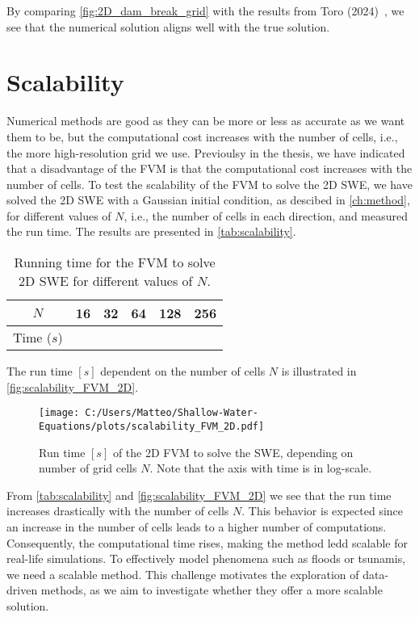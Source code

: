 By comparing \autoref{fig:2D_dam_break_grid} with the results from Toro (2024)~\cite{Toro2024}, we see that the numerical solution aligns well with the true solution.


\section{Scalability}\label{sec:scalability}
Numerical methods are good as they can be more or less as accurate as we want them to be, but the computational cost increases with the number of cells, i.e., the more high-resolution grid we use.
Previoulsy in the thesis, we have indicated that a disadvantage of the FVM is that the computational cost increases with the number of cells.
To test the scalability of the FVM to solve the 2D SWE, we have solved the 2D SWE with a Gaussian initial condition, as descibed in \autoref{ch:method}, for different values of $N$, i.e., the number of cells in each direction, and measured the run time.
The results are presented in \autoref{tab:scalability}.
\begin{table}[H]
    \centering
    \begin{tabular}{c|ccccc}
        \hline
        $N$ & 16 & 32 & 64 & 128 & 256 \\
        \hline 
        Time ($s$) & 
         &
         &
         &
         &
        
        \\
        \hline
    \end{tabular}
    \caption{Running time for the FVM to solve 2D SWE for different values of $N$.}\label{tab:scalability}
\end{table}
The run time $[s]$ dependent on the number of cells $N$ is illustrated in \autoref{fig:scalability_FVM_2D}.
\begin{figure}[H]
    \centering
    \texttt{[image: C:/Users/Matteo/Shallow-Water-Equations/plots/scalability\_FVM\_2D.pdf]}
    \caption{Run time $[s]$ of the 2D FVM to solve the SWE, depending on number of grid cells $N$.
            Note that the axis with time is in log-scale.}\label{fig:scalability_FVM_2D}
\end{figure}
From \autoref{tab:scalability} and \autoref{fig:scalability_FVM_2D} we see that the run time increases drastically with the number of cells $N$.
This behavior is expected since an increase in the number of cells leads to a higher number of computations.
Consequently, the computational time rises, making the method ledd scalable for real-life simulations.
To effectively model phenomena such as floods or tsunamis, we need a scalable method.
This challenge motivates the exploration of data-driven methods, as we aim to investigate whether they offer a more scalable solution.


